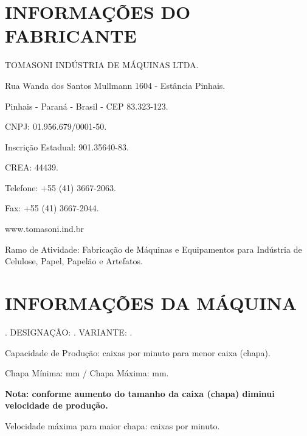 \thispagestyle{fancy}

\vspace*{40 pt}

\section{\large{INFORMAÇÕES DO FABRICANTE}}

TOMASONI INDÚSTRIA DE MÁQUINAS LTDA.

Rua Wanda dos Santos Mullmann 1604 - Estância Pinhais.

Pinhais - Paraná - Brasil - CEP 83.323-123.

CNPJ: 01.956.679/0001-50.

Inscrição Estadual: 901.35640-83.

CREA: 44439.

Telefone: +55 (41) 3667-2063.

Fax: +55 (41) 3667-2044.

www.tomasoni.ind.br

Ramo de Atividade: Fabricação de Máquinas e Equipamentos para Indústria de Celulose, Papel, Papelão e Artefatos.

\section{\large{INFORMAÇÕES DA MÁQUINA}}

\machineName \space. DESIGNAÇÃO: \machineShortName. VARIANTE: \variant.

Capacidade de Produção: \productionCapacityminimumSheet \space caixas por minuto para menor caixa (chapa).

Chapa Mínima: \minimumSheet mm / Chapa Máxima: \maximumSheet mm.

\textbf{Nota: conforme aumento do tamanho da caixa (chapa) diminui velocidade de produção.}

Velocidade máxima para maior chapa: \productionCapacitymaximumSheet \space caixas por minuto.

